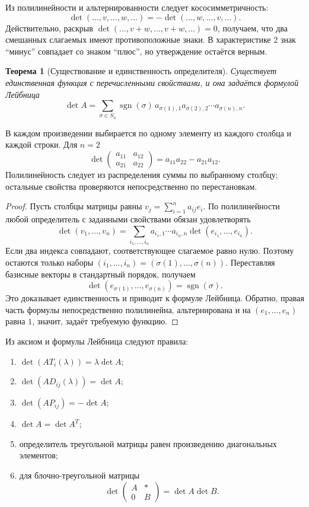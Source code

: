 \documentclass[12pt,a4paper,oneside,openany]{book}
\theoremstyle{definition}
\theoremstyle{plain}
\newtheorem{theorem}{Теорема}[chapter]
\theoremstyle{remark}
\DeclareMathOperator{\sgn}{sgn}
\begin{document}
Из полилинейности и альтернированности следует кососимметричность:
\[
  \det(\ldots,v,\ldots,w,\ldots)
  =-\det(\ldots,w,\ldots,v,\ldots).
\]
Действительно, раскрыв
$\det(\ldots,v+w,\ldots,v+w,\ldots)=0$, получаем, что два смешанных
слагаемых имеют противоположные знаки. В характеристике $2$ знак ``минус''
совпадает со знаком ``плюс'', но утверждение остаётся верным.


\begin{theorem}[Существование и единственность определителя]
Существует единственная функция с перечисленными свойствами, и она задаётся
формулой Лейбница
\[
  \det A=\sum_{\sigma\in S_n}
  \sgn(\sigma)\,
  a_{\sigma(1),1}a_{\sigma(2),2}\cdots a_{\sigma(n),n}.
\]
\end{theorem}

В каждом произведении выбирается по одному элементу из каждого столбца и
каждой строки. Для $n=2$
\[
  \det\begin{pmatrix}a_{11}&a_{12}\\a_{21}&a_{22}\end{pmatrix}
  =a_{11}a_{22}-a_{21}a_{12}.
\]
Полилинейность следует из распределения суммы по выбранному столбцу;
остальные свойства проверяются непосредственно по перестановкам.

\begin{proof}
Пусть столбцы матрицы равны
$v_j=\sum_{i=1}^{n}a_{ij}e_i$. По полилинейности любой определитель с
заданными свойствами обязан удовлетворять
\[
  \det(v_1,\ldots,v_n)
  =\sum_{i_1,\ldots,i_n}
   a_{i_1,1}\cdots a_{i_n,n}
   \det(e_{i_1},\ldots,e_{i_n}).
\]
Если два индекса совпадают, соответствующее слагаемое равно нулю.
Поэтому остаются только наборы
$(i_1,\ldots,i_n)=(\sigma(1),\ldots,\sigma(n))$. Переставляя базисные
векторы в стандартный порядок, получаем
\[
  \det(e_{\sigma(1)},\ldots,e_{\sigma(n)})=\sgn(\sigma).
\]
Это доказывает единственность и приводит к формуле Лейбница.
Обратно, правая часть формулы непосредственно полилинейна,
альтернирована и на $(e_1,\ldots,e_n)$ равна $1$, значит, задаёт
требуемую функцию.
\end{proof}


Из аксиом и формулы Лейбница следуют правила:
\begin{enumerate}[label=\arabic*)]
  \item $\det(A T_i(\lambda))=\lambda\det A$;
  \item $\det(A D_{ij}(\lambda))=\det A$;
  \item $\det(A P_{ij})=-\det A$;
  \item $\det A=\det A^T$;
  \item определитель треугольной матрицы равен произведению диагональных
  элементов;
  \item для блочно-треугольной матрицы
  \[
    \det\begin{pmatrix}A&*\\0&B\end{pmatrix}
    =\det A\det B.
  \]
\end{enumerate}
\end{document}
